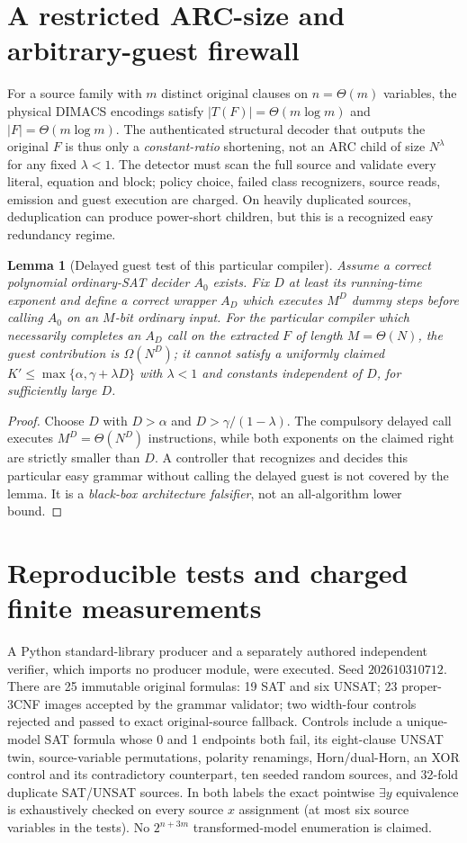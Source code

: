 \documentclass[11pt]{article}
\newtheorem{lemma}{Lemma}
\begin{document}
\section{A restricted ARC-size and arbitrary-guest firewall}
For a source family with $m$ distinct original clauses on $n=\Theta(m)$ variables, the physical DIMACS encodings satisfy $|T(F)|=\Theta(m\log m)$ and $|F|=\Theta(m\log m)$. The authenticated structural decoder that outputs the original $F$ is thus only a \emph{constant-ratio} shortening, not an ARC child of size $N^{\lambda}$ for any fixed $\lambda<1$. The detector must scan the full source and validate every literal, equation and block; policy choice, failed class recognizers, source reads, emission and guest execution are charged. On heavily duplicated sources, deduplication can produce power-short children, but this is a recognized easy redundancy regime.

\begin{lemma}[Delayed guest test of this particular compiler]
Assume a correct polynomial ordinary-SAT decider $A_0$ exists. Fix $D$ at least its running-time exponent and define a correct wrapper $A_D$ which executes $M^D$ dummy steps before calling $A_0$ on an $M$-bit ordinary input. For the particular compiler which necessarily completes an $A_D$ call on the extracted $F$ of length $M=\Theta(N)$, the guest contribution is $\Omega(N^D)$; it cannot satisfy a uniformly claimed $K'\le\max\{\alpha,\gamma+\lambda D\}$ with $\lambda<1$ and constants independent of $D$, for sufficiently large $D$.
\end{lemma}
\begin{proof}
Choose $D$ with $D>\alpha$ and $D>\gamma/(1-\lambda)$. The compulsory delayed call executes $M^D=\Theta(N^D)$ instructions, while both exponents on the claimed right are strictly smaller than $D$. A controller that recognizes and decides this particular easy grammar without calling the delayed guest is not covered by the lemma. It is a \emph{black-box architecture falsifier}, not an all-algorithm lower bound.
\end{proof}

\section{Reproducible tests and charged finite measurements}
A Python standard-library producer and a separately authored independent verifier, which imports no producer module, were executed. Seed $202610310712$. There are 25 immutable original formulas: 19 SAT and six UNSAT; 23 proper-3CNF images accepted by the grammar validator; two width-four controls rejected and passed to exact original-source fallback. Controls include a unique-model SAT formula whose 0 and 1 endpoints both fail, its eight-clause UNSAT twin, source-variable permutations, polarity renamings, Horn/dual-Horn, an XOR control and its contradictory counterpart, ten seeded random sources, and 32-fold duplicate SAT/UNSAT sources. In both labels the exact pointwise $\exists y$ equivalence is exhaustively checked on every source $x$ assignment (at most six source variables in the tests). No $2^{n+3m}$ transformed-model enumeration is claimed.
\end{document}
